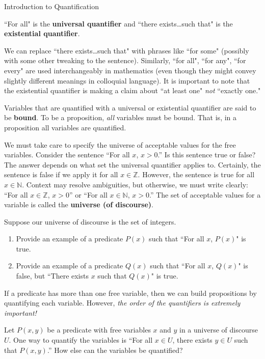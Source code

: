 \begin{section}{Introduction to Quantification}
\begin{definition}
``For all" is the \textbf{universal quantifier} and ``there exists\ldots such that" is the \textbf{existential quantifier}.
\end{definition}

We can replace ``there exists\ldots such that" with phrases  like ``for some" (possibly with some other tweaking to the sentence). Similarly, ``for all", ``for any", ``for every" are used interchangeably in mathematics (even though they might convey slightly different meanings in colloquial language). It is important to note that the existential quantifier is making a claim about ``at least one" \emph{not} ``exactly one." 

Variables that are quantified with a universal or existential quantifier are said to be \textbf{bound}.  To be a proposition, \emph{all} variables must be bound. That is, in a proposition all variables are quantified. 

We must take care to specify the universe of acceptable values for the free variables. Consider the sentence ``For all $x$, $x>0$.'' Is this sentence true or false? The answer depends on what set the universal quantifier applies to. Certainly, the sentence is false if we apply it for all $x\in\mathbb{Z}$. However, the sentence is true for all $x\in\mathbb{N}$. Context may resolve ambiguities, but otherwise, we must write clearly: ``For all $x\in\mathbb{Z}$, $x>0$'' or ``For all $x\in\mathbb{N}$, $x>0$.'' The set of acceptable values for a variable is called the \textbf{universe (of discourse)}.

\begin{exercise}
Suppose our universe of discourse is the set of integers.
\begin{enumerate}[label=\textrm{(\alph*)}]
\item Provide an example of a predicate $P(x)$ such that ``For all $x$, $P(x)$" is true.
\item Provide an example of a predicate $Q(x)$ such that ``For all $x$, $Q(x)$" is false, but ``There exists $x$ such that $Q(x)$" is true.
\end{enumerate}
\end{exercise}

If a predicate has more than one free variable, then we can build propositions by quantifying each variable.  However, \emph{the order of the quantifiers is extremely important!}

\begin{exercise}\label{exer:ways to quantify}
Let $P(x,y)$ be a predicate with free variables $x$ and $y$ in a universe of discourse $U$. One way to quantify the variables is ``For all $x \in U$, there exists $y \in U$ such that $P(x,y)$.'' How else can the variables be quantified?
\end{exercise}


\end{section}
